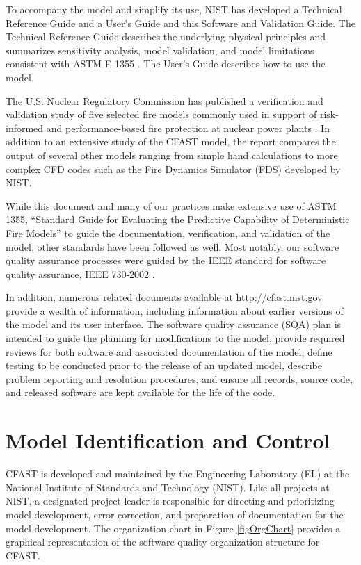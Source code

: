 To accompany the model and simplify its use, NIST has developed a Technical Reference Guide \cite{CFAST_Tech_Guide_6} and a User's Guide \cite{CFAST_Users_Guide_6} and this Software and Validation Guide.  The Technical Reference Guide describes the underlying physical principles and summarizes sensitivity analysis, model validation, and model limitations consistent with ASTM E 1355 \cite{ASTM:E1355}.  The User's Guide describes how to use the model.

The U.S. Nuclear Regulatory Commission has published a verification and validation study of five selected fire models commonly used in support of risk-informed and performance-based fire protection at nuclear power plants \cite{NRCNUREG1824}. In addition to an extensive study of the CFAST model, the report compares the output of several other models ranging from simple hand calculations to more complex CFD codes such as the Fire Dynamics Simulator (FDS) developed by NIST.

While this document and many of our practices make extensive use of ASTM 1355, ``Standard Guide for Evaluating the Predictive Capability of Deterministic Fire Models'' \cite{ASTM:E1355} to guide the documentation, verification, and validation of the model, other standards have been followed as well.  Most notably, our software quality assurance processes were guided by the IEEE standard for software quality assurance, IEEE 730-2002 \cite{IEEE:730}.

In addition, numerous related documents available at http://cfast.nist.gov provide a wealth of information, including information about earlier versions of the model and its user interface. The software quality assurance (SQA) plan is intended to guide the planning for modifications to the model, provide required reviews for both software and associated documentation of the model, define testing to be conducted prior to the release of an updated model, describe problem reporting and resolution procedures, and ensure all records, source code, and released software are kept available for the life of the code.

\section{Model Identification and Control}

CFAST is developed and maintained by the Engineering Laboratory (EL) at the National Institute of Standards and Technology (NIST). Like all projects at NIST, a designated project leader is responsible for directing and prioritizing model development, error correction, and preparation of documentation for the model development.  The organization chart in Figure \ref{figOrgChart} provides a graphical representation of the software quality organization structure for CFAST.

